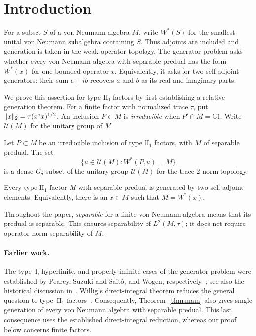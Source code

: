 \section{Introduction}
\label{sec:introduction}

For a subset $S$ of a von Neumann algebra $M$, write $W^*(S)$ for the
smallest unital von Neumann subalgebra containing $S$. Thus adjoints
are included and generation is taken in the weak operator topology.
The generator problem asks whether every von Neumann algebra with
separable predual has the form $W^*(x)$ for one bounded operator $x$.
Equivalently, it asks for two self-adjoint generators: their sum
$a+ib$ recovers $a$ and $b$ as its real and imaginary parts.

We prove this assertion for type $\mathrm{II}_1$ factors by first
establishing a relative generation theorem. For a finite factor with
normalized trace $\tau$, put $\lVert x\rVert_2=\tau(x^*x)^{1/2}$.
An inclusion $P\subset M$ is \emph{irreducible} when
$P'\cap M=\mathbb C1$. Write $\mathcal U(M)$ for the unitary group
of $M$.

\begin{theorem}\label{thm:relative-generation}
Let $P\subset M$ be an irreducible inclusion of type $\mathrm{II}_1$
factors, with $M$ of separable predual. The set
\[
 \{u\in\mathcal U(M):W^*(P,u)=M\}
\]
is a dense $G_\delta$ subset of the unitary group $\mathcal U(M)$
for the trace $2$-norm topology.
\end{theorem}

\begin{theorem}\label{thm:main}
Every type $\mathrm{II}_1$ factor $M$ with separable predual is
generated by two self-adjoint elements. Equivalently, there is an
$x\in M$ such that $M=W^*(x)$.
\end{theorem}

Throughout the paper,
\emph{separable} for a finite von Neumann algebra means that its
predual is separable. This ensures separability of $L^2(M,\tau)$;
it does not require operator-norm separability of $M$.

\paragraph{Earlier work.}
The type~I, hyperfinite, and properly infinite cases of the generator
problem were established by Pearcy, Suzuki and Sait\^o, and Wogen,
respectively~\cite{Pearcy1962,SuzukiSaito1963,Wogen1969};
see also the historical discussion in~\cite[Section~3]{Sherman2012}.
Willig's direct-integral theorem reduces the general question to
type~$\mathrm{II}_1$ factors~\cite[Corollary~2]{Willig1974}.
Consequently, Theorem~\ref{thm:main} also gives single generation of
every von Neumann algebra with separable predual. This last consequence
uses the established direct-integral reduction, whereas our proof
below concerns finite factors.

